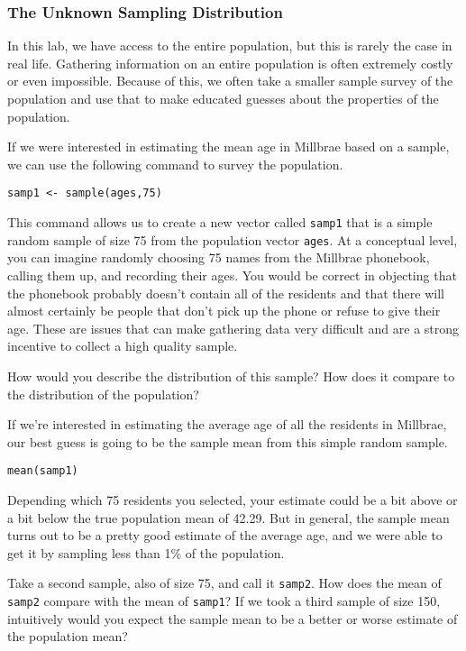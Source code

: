\documentclass[11pt]{article}
\begin{document}
\subsubsection*{The Unknown Sampling Distribution}
In this lab, we have access to the entire population, but this is rarely the case in real life.  Gathering information on an entire population is often extremely costly or even impossible.  Because of this, we often take a smaller sample survey of the population and use that to make educated guesses about the properties of the population.

If we were interested in estimating the mean age in Millbrae based on a sample, we can use the following command to survey the population.

\begin{lstlisting}
samp1 <- sample(ages,75)
\end{lstlisting}

This command allows us to create a new vector called \texttt{samp1} that is a simple random sample of size 75 from the population vector \texttt{ages}.  At a conceptual level, you can imagine randomly choosing 75 names from the Millbrae  phonebook, calling them up, and recording their ages.  You would be correct in objecting that the phonebook probably doesn't contain all of the residents and that there will almost certainly be people that don't pick up the phone or refuse to give their age.  These are issues that can make gathering data very difficult and are a strong incentive to collect a high quality sample.

\begin{exercise}
How would you describe the distribution of this sample?   How does it compare to the distribution of the population?
\end{exercise}

If we're interested in estimating the average age of all the residents in Millbrae, our best guess is going to be the sample mean from this simple random sample.

\begin{lstlisting}
mean(samp1)
\end{lstlisting}

Depending which 75 residents you selected, your estimate could be a bit above or a bit below the true population mean of 42.29.  But in general, the sample mean turns out to be a pretty good estimate of the average age, and we were able to get it by sampling less than 1\% of the population.

\begin{exercise}
Take a second sample, also of size 75, and call it \texttt{samp2}.  How does the mean of \texttt{samp2} compare with the mean of \texttt{samp1}?  If we took a third sample of size 150, intuitively would you expect the sample mean to be a better or worse estimate of the population mean?
\end{exercise}
\end{document}

